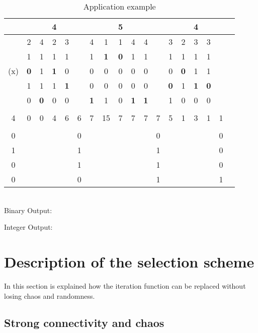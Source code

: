 \documentclass[conference]{IEEEtran}
\begin{document}
\begin{table*}
\centering
\begin{tabular}{|c|ccccc|cccccc|cccccc|}
\hline\hline
 & & & 4 & & & & & 5 & & & & & & 4 & & & \\ \hline
 & 2 & 4 & 2 & 3 & & 4 & 1 & 1 & 4 & 4 & & 3 & 2 & 3 & 3 & & \\
\hline

& 1& 1& 1& 1&
 & 1& \textbf{1} & \textbf{0} &1 &1 &
 &1 & 1& 1&1 &
 & \\
(x) & \textbf{0} & 1& \textbf{1} & 0 &
 &0 &0& 0&0 & 0&
 &0 &\textbf{0} & 1&1 & &\\
&1 & 1& 1& \textbf{1}&
 &0 &0 &0 &0 &0 &
& \textbf{0} & 1& \textbf{1} & \textbf{0} &
 & \\
&0 &\textbf{0} &0 &0 &
 &\textbf{1} &1 &0 &\textbf{1} &\textbf{1} &
 &1 &0 & 0&0 &
 &\\\hline
 & & & & &  & & & & & &  & & & & &  & \\
4 &0 &0 &4 &6&6 &7 &15 &7 &7 &7 &7&5  &1 &3 &1 &1 &  \\ & & & && & & & &
& &  & & & & & & \\
0 & & & & &
0 & &  &  & & &
0 & & & & &
0 & \\
1 &  & &  &  &
1 & & & & & &
1 & &  & & & 0 &\\
0 & & & &  &
1 & & & & & &
1 &  & &  &  &
0 &\\
0 & &  & & &
0 & & & & & &
1 & & & & &
1 &\\
\hline\hline
\end{tabular}\\
\vspace{0.5cm}
Binary Output:


Integer Output:

\caption{Application example}
\label{table application example}
\end{table*}



\section{Description of the selection scheme}
\label{section:description}

In this section is explained how the iteration function  can be replaced without losing chaos and randomness.

\subsection{Strong connectivity and chaos}
\end{document}
